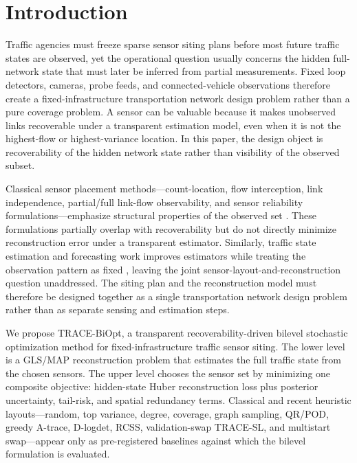 \section{Introduction}
\label{sec:introduction}

Traffic agencies must freeze sparse sensor siting plans before most future traffic states are observed, yet the operational question usually concerns the hidden full-network state that must later be inferred from partial measurements. Fixed loop detectors, cameras, probe feeds, and connected-vehicle observations therefore create a fixed-infrastructure transportation network design problem rather than a pure coverage problem. A sensor can be valuable because it makes unobserved links recoverable under a transparent estimation model, even when it is not the highest-flow or highest-variance location. In this paper, the design object is recoverability of the hidden network state rather than visibility of the observed subset.

Classical sensor placement methods---count-location, flow interception, link independence, partial/full link-flow observability, and sensor reliability formulations---emphasize structural properties of the observed set \citep{yang1998optimal,gentili2011survey,hu2009identification,he2013graphical,viti2014partial,xu2016robust,salari2019failure}. These formulations partially overlap with recoverability but do not directly minimize reconstruction error under a transparent estimator. Similarly, traffic state estimation and forecasting work improves estimators while treating the observation pattern as fixed \citep{coric2012traffic,seo2017survey,li2018dcrnn,yu2018stgcn}, leaving the joint sensor-layout-and-reconstruction question unaddressed. The siting plan and the reconstruction model must therefore be designed together as a single transportation network design problem rather than as separate sensing and estimation steps.

We propose TRACE-BiOpt, a transparent recoverability-driven bilevel stochastic optimization method for fixed-infrastructure traffic sensor siting. The lower level is a GLS/MAP reconstruction problem that estimates the full traffic state from the chosen sensors. The upper level chooses the sensor set by minimizing one composite objective: hidden-state Huber reconstruction loss plus posterior uncertainty, tail-risk, and spatial redundancy terms. Classical and recent heuristic layouts---random, top variance, degree, coverage, graph sampling, QR/POD, greedy A-trace, D-logdet, RCSS, validation-swap TRACE-SL, and multistart swap---appear only as pre-registered baselines against which the bilevel formulation is evaluated.


